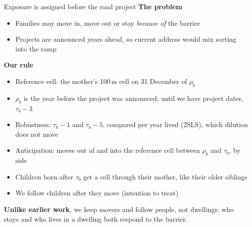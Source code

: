 \documentclass[aspectratio=169, 10pt]{beamer}
\begin{document}
\begin{frame}{Exposure is assigned before the road project}
\small
\textbf{The problem}
\begin{itemize}\setlength{\itemsep}{0pt}
  \item Families may move in, move out or stay \emph{because of} the barrier
  \item Projects are announced years ahead, so current address would mix sorting into the ramp
\end{itemize}

\smallskip
\textbf{Our rule}
\begin{itemize}\setlength{\itemsep}{0pt}
  \item Reference cell: the mother's 100\,m cell on 31 December of $\rho_b$
  \item $\rho_b$ is the year before the project was announced; until we have project dates, $\tau_b - 3$
  \item Robustness: $\tau_b - 1$ and $\tau_b - 5$, compared per year lived (2SLS), which dilution does not move
  \item Anticipation: moves out of and into the reference cell between $\rho_b$ and $\tau_b$, by side
  \item Children born after $\tau_b$ get a cell through their mother, like their older siblings
  \item We follow children after they move (intention to treat)
\end{itemize}

\smallskip
\textbf{Unlike earlier work}, we keep movers and follow people, not dwellings: who stays \parencite{lindgrenSoundEnvironmentHealth2021} and who lives in a dwelling \parencite{morettiTrafficNoiseExternality2025} both respond to the barrier.
\end{frame}
\end{document}
